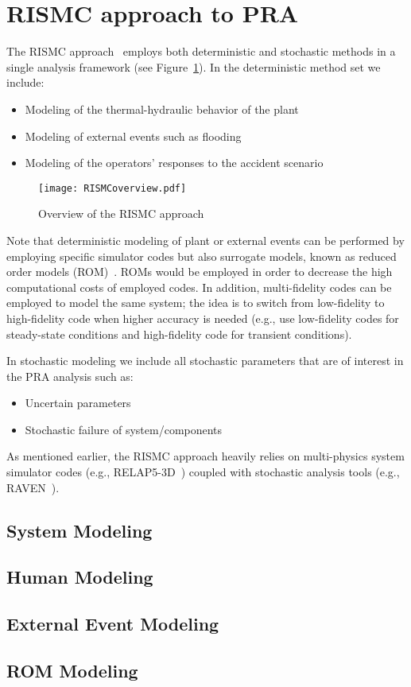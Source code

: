 \section{RISMC approach to PRA}
\label{sec:rismc}
The RISMC approach~\cite{RISMC} employs both deterministic and stochastic methods 
in a single analysis framework (see Figure~\ref{fig:RISMCoverview}). In the deterministic method 
set we include:
\begin{itemize}
  \item Modeling of the thermal-hydraulic behavior of the plant~\cite{BWR_SBO_Mandelli,BWRanalysis}
  \item Modeling of external events such as flooding~\cite{mandelliPSA2015}
  \item Modeling of the operators’ responses to the accident scenario~\cite{HRA_BoringReport2014}
\end{itemize}

\begin{figure}
    \centering
    \texttt{[image: RISMCoverview.pdf]}
    \caption{Overview of the RISMC approach}
    \label{fig:RISMCoverview}
\end{figure}

Note that deterministic modeling of plant or external events can be performed by employing 
specific simulator codes but also surrogate models, known as reduced order models (ROM)~\cite{ROM_Khalik}. 
ROMs would be employed in order to decrease the high computational costs of employed codes.
In addition, multi-fidelity codes can be employed to model the same system; the idea is to 
switch from low-fidelity to high-fidelity code when higher accuracy is needed (e.g., use 
low-fidelity codes for steady-state conditions and high-fidelity code for transient conditions).

In stochastic modeling we include all stochastic parameters that are of interest in the PRA 
analysis such as:
\begin{itemize}
  \item Uncertain parameters
  \item Stochastic failure of system/components
\end{itemize}
As mentioned earlier, the RISMC approach heavily relies on multi-physics system simulator 
codes (e.g., RELAP5-3D~\cite{relap5}) coupled with stochastic analysis tools (e.g., RAVEN~\cite{RAVEN_PSAM_2014}). 

\subsection{System Modeling}

\subsection{Human Modeling}

\subsection{External Event Modeling}

\subsection{ROM Modeling}